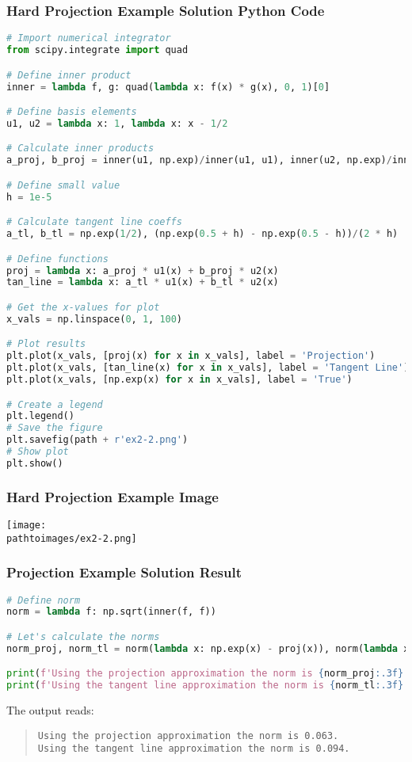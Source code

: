 \documentclass{beamer}
\newcommand{\pathtoimages}{/Users/charlesrambo/Desktop/Bootcamp24/Images}
\begin{document}
\begin{frame}[fragile]
\frametitle{Hard Projection Example Solution Python Code}
\begin{lstlisting}[language=Python]
# Import numerical integrator
from scipy.integrate import quad

# Define inner product
inner = lambda f, g: quad(lambda x: f(x) * g(x), 0, 1)[0]

# Define basis elements
u1, u2 = lambda x: 1, lambda x: x - 1/2 

# Calculate inner products
a_proj, b_proj = inner(u1, np.exp)/inner(u1, u1), inner(u2, np.exp)/inner(u2, u2) 

# Define small value
h = 1e-5

# Calculate tangent line coeffs
a_tl, b_tl = np.exp(1/2), (np.exp(0.5 + h) - np.exp(0.5 - h))/(2 * h)

# Define functions 
proj = lambda x: a_proj * u1(x) + b_proj * u2(x)
tan_line = lambda x: a_tl * u1(x) + b_tl * u2(x)

# Get the x-values for plot
x_vals = np.linspace(0, 1, 100)

# Plot results
plt.plot(x_vals, [proj(x) for x in x_vals], label = 'Projection')
plt.plot(x_vals, [tan_line(x) for x in x_vals], label = 'Tangent Line')
plt.plot(x_vals, [np.exp(x) for x in x_vals], label = 'True')

# Create a legend
plt.legend()
# Save the figure
plt.savefig(path + r'ex2-2.png')
# Show plot
plt.show()
\end{lstlisting}
\end{frame}

\begin{frame}[fragile]
\frametitle{Hard Projection Example Image}
\begin{center}
\texttt{[image: \\pathtoimages/ex2-2.png]}
\end{center}
\end{frame}

\begin{frame}[fragile]
\frametitle{Projection Example Solution Result}

\begin{lstlisting}[language=Python]
# Define norm
norm = lambda f: np.sqrt(inner(f, f))

# Let's calculate the norms
norm_proj, norm_tl = norm(lambda x: np.exp(x) - proj(x)), norm(lambda x: np.exp(x) - tan_line(x))

print(f'Using the projection approximation the norm is {norm_proj:.3f}.')
print(f'Using the tangent line approximation the norm is {norm_tl:.3f}.')
\end{lstlisting}
The output reads:
\begin{quote}
{
\small
\texttt{Using the projection approximation the norm is 0.063.}\\
\texttt{Using the tangent line approximation the norm is 0.094.}
}
\end{quote}
\end{frame}
\end{document}
